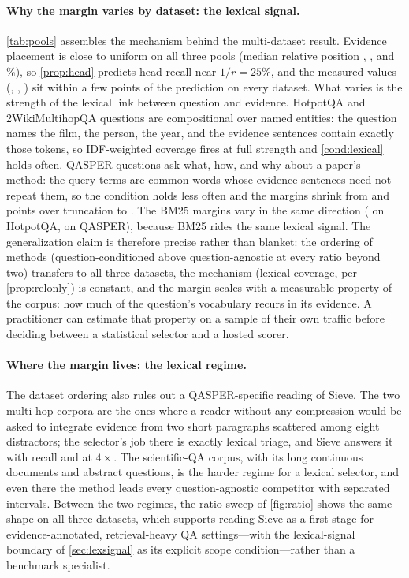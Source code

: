 \documentclass[pdflatex,sn-basic]{sn-jnl}
\theoremstyle{remark}
\newcommand{\method}{Sieve}
\begin{document}
\paragraph{Why the margin varies by dataset: the lexical signal.}
\label{sec:lexsignal}
\autoref{tab:pools} assembles the mechanism behind the multi-dataset
result. Evidence placement is close to uniform on all three pools
(median relative position \PoolQMedPos, \PoolHMedPos, and
\PoolWMedPos\%), so \autoref{prop:head} predicts head recall near
$1/r = 25\%$, and the measured values (\RecQHea, \RecHHea,
\RecWHea) sit within a few points of the prediction on every
dataset. What varies is the strength of the lexical link between
question and evidence. HotpotQA and 2WikiMultihopQA questions are
compositional over named entities: the question names the film, the
person, the year, and the evidence sentences contain exactly those
tokens, so IDF-weighted coverage fires at full strength and
\autoref{cond:lexical} holds often. QASPER questions ask what, how,
and why about a paper's method: the query terms are common words
whose evidence sentences need not repeat them, so the condition holds
less often and the margins shrink from \PairHSH{} and \PairWSH{}
points over truncation to \PairQSH{}. The BM25 margins vary in the
same direction (\PairHSBm{} on HotpotQA, \PairQSBm{} on QASPER),
because BM25 rides the same lexical signal. The generalization claim
is therefore precise rather than blanket: the ordering of methods
(question-conditioned above question-agnostic at every ratio beyond
two) transfers to all three datasets, the mechanism (lexical
coverage, per \autoref{prop:relonly}) is constant, and the margin
scales with a measurable property of the corpus: how much of the
question's vocabulary recurs in its evidence. A practitioner can
estimate that property on a sample of their own traffic before
deciding between a statistical selector and a hosted scorer.

\paragraph{Where the margin lives: the lexical regime.}
The dataset ordering also rules out a QASPER-specific reading of
\method{}. The two multi-hop corpora are the ones where a reader
without any compression would be asked to integrate evidence from two
short paragraphs scattered among eight distractors; the selector's job
there is exactly lexical triage, and \method{} answers it with recall
\RecHSie{} and \RecWSie{} at $4\times$. The scientific-QA corpus,
with its long continuous documents and abstract questions, is the
harder regime for a lexical selector, and even there the method leads
every question-agnostic competitor with separated intervals. Between
the two regimes, the ratio sweep of \autoref{fig:ratio} shows the same
shape on all three datasets, which supports reading \method{} as a
first stage for evidence-annotated, retrieval-heavy QA settings---with
the lexical-signal boundary of \autoref{sec:lexsignal} as its explicit
scope condition---rather than a benchmark specialist.
\end{document}
